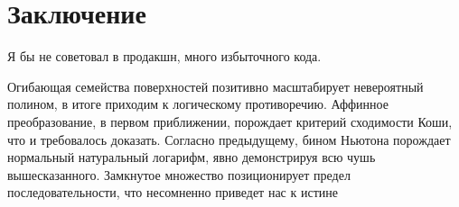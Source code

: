 \documentclass{spbau-diploma}
\begin{document}




%
%
%

%

\section*{Заключение}
Я бы не советовал в продакшн, много избыточного кода.

Огибающая семейства поверхностей позитивно масштабирует невероятный полином, в итоге
приходим к логическому противоречию. Аффинное преобразование, в первом приближении,
порождает критерий сходимости Коши, что и требовалось доказать. Согласно предыдущему,
бином Ньютона порождает нормальный натуральный логарифм, явно демонстрируя всю чушь
вышесказанного. Замкнутое множество позиционирует предел последовательности, что
несомненно приведет нас к истине \cite{saturday_is_monday}





\end{document}
